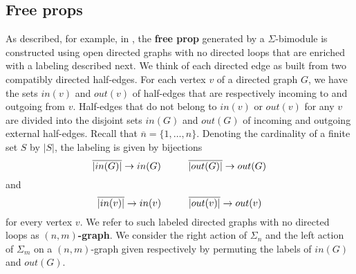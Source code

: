 \documentclass{amsart}
\theoremstyle{definition}
\begin{document}
	\subsection{Free props}	As described, for example, in \cite{markl2008operads}, the \textbf{free prop} generated by a $\Sigma$-bimodule is constructed using open directed graphs with no directed loops that are enriched with a labeling described next. We think of each directed edge as built from two compatibly directed half-edges. For each vertex $v$ of a directed graph $G$, we have the sets $in(v)$ and $out(v)$ of half-edges that are respectively incoming to and outgoing from $v$. Half-edges that do not belong to $in(v)$ or $out(v)$ for any $v$ are divided into the disjoint sets $in(G)$ and $out(G)$ of incoming and outgoing external half-edges. Recall that $\overline{n} = \{1,\dots,n\}$. Denoting the cardinality of a finite set $S$ by $|S|$, the labeling is given by bijections  
	$$ \overline{|in(G)|}\to in(G)\hspace*{1cm}\overline{|out(G)|}\to out(G)$$
	and
	$$ \overline{|in(v)|}\to in(v)\hspace*{1cm}\overline{|out(v)|}\to out(v)$$ 
	for every vertex $v$. We refer to such labeled directed graphs with no directed loops as $(n,m)$\textbf{-graph}. We consider the right action of $\Sigma_n$ and the left action of $\Sigma_m$ on a $(n,m)$-graph given respectively by permuting the labels of $in(G)$ and $out(G)$. 
	
\end{document}
